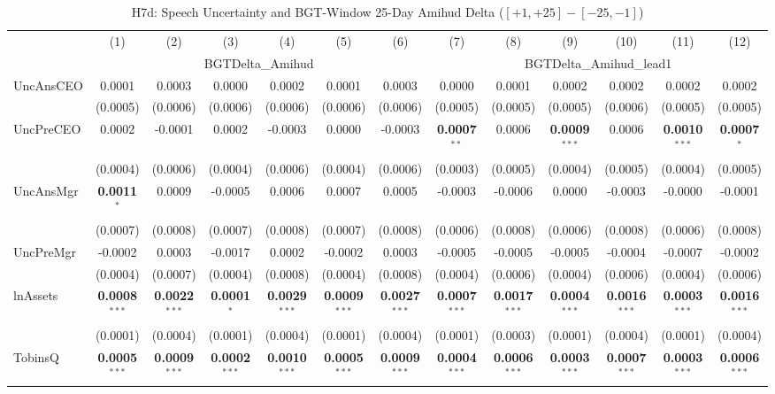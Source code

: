 \documentclass[11pt,a4paper]{article}
\begin{document}
\begin{table}[htbp]
\centering
\caption{H7d: Speech Uncertainty and BGT-Window 25-Day Amihud Delta ($[+1,+25]-[-25,-1]$)}
\label{tab:h7d}
\scriptsize
\begin{tabular}{lcccccccccccc}
\toprule
 & (1) & (2) & (3) & (4) & (5) & (6) & (7) & (8) & (9) & (10) & (11) & (12) \\
 & \multicolumn{6}{c}{BGTDelta\_Amihud} & \multicolumn{6}{c}{BGTDelta\_Amihud\_lead1} \\
\cmidrule(lr){2-7} \cmidrule(lr){8-13}
\midrule
UncAnsCEO & 0.0001 & 0.0003 & 0.0000 & 0.0002 & 0.0001 & 0.0003 & 0.0000 & 0.0001 & 0.0002 & 0.0002 & 0.0002 & 0.0002 \\
 & (0.0005) & (0.0006) & (0.0006) & (0.0006) & (0.0006) & (0.0006) & (0.0005) & (0.0005) & (0.0005) & (0.0006) & (0.0005) & (0.0005) \\
UncPreCEO & 0.0002 & -0.0001 & 0.0002 & -0.0003 & 0.0000 & -0.0003 & \textbf{0.0007}$^{**}$ & 0.0006 & \textbf{0.0009}$^{***}$ & 0.0006 & \textbf{0.0010}$^{***}$ & \textbf{0.0007}$^{*}$ \\
 & (0.0004) & (0.0006) & (0.0004) & (0.0006) & (0.0004) & (0.0006) & (0.0003) & (0.0005) & (0.0004) & (0.0005) & (0.0004) & (0.0005) \\
UncAnsMgr & \textbf{0.0011}$^{*}$ & 0.0009 & -0.0005 & 0.0006 & 0.0007 & 0.0005 & -0.0003 & -0.0006 & 0.0000 & -0.0003 & -0.0000 & -0.0001 \\
 & (0.0007) & (0.0008) & (0.0007) & (0.0008) & (0.0007) & (0.0008) & (0.0006) & (0.0008) & (0.0006) & (0.0008) & (0.0006) & (0.0008) \\
UncPreMgr & -0.0002 & 0.0003 & -0.0017 & 0.0002 & -0.0002 & 0.0003 & -0.0005 & -0.0005 & -0.0005 & -0.0004 & -0.0007 & -0.0002 \\
 & (0.0004) & (0.0007) & (0.0004) & (0.0008) & (0.0004) & (0.0008) & (0.0004) & (0.0006) & (0.0004) & (0.0006) & (0.0004) & (0.0006) \\
\midrule
lnAssets & \textbf{0.0008}$^{***}$ & \textbf{0.0022}$^{***}$ & \textbf{0.0001}$^{*}$ & \textbf{0.0029}$^{***}$ & \textbf{0.0009}$^{***}$ & \textbf{0.0027}$^{***}$ & \textbf{0.0007}$^{***}$ & \textbf{0.0017}$^{***}$ & \textbf{0.0004}$^{***}$ & \textbf{0.0016}$^{***}$ & \textbf{0.0003}$^{***}$ & \textbf{0.0016}$^{***}$ \\
 & (0.0001) & (0.0004) & (0.0001) & (0.0004) & (0.0001) & (0.0004) & (0.0001) & (0.0003) & (0.0001) & (0.0004) & (0.0001) & (0.0004) \\
TobinsQ & \textbf{0.0005}$^{***}$ & \textbf{0.0009}$^{***}$ & \textbf{0.0002}$^{***}$ & \textbf{0.0010}$^{***}$ & \textbf{0.0005}$^{***}$ & \textbf{0.0009}$^{***}$ & \textbf{0.0004}$^{***}$ & \textbf{0.0006}$^{***}$ & \textbf{0.0003}$^{***}$ & \textbf{0.0007}$^{***}$ & \textbf{0.0003}$^{***}$ & \textbf{0.0006}$^{***}$ \\

\end{tabular}
\end{table}
\end{document}

